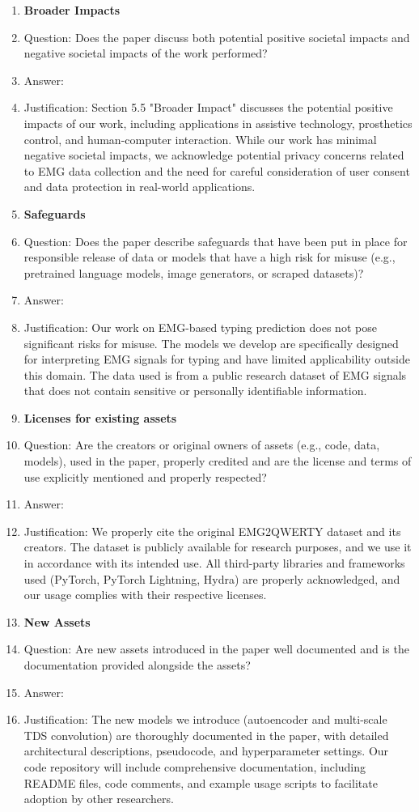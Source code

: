 \begin{enumerate}
\item {\bf Broader Impacts}
    \item[] Question: Does the paper discuss both potential positive societal impacts and negative societal impacts of the work performed?
    \item[] Answer: \answerYes{}
    \item[] Justification: Section 5.5 "Broader Impact" discusses the potential positive impacts of our work, including applications in assistive technology, prosthetics control, and human-computer interaction. While our work has minimal negative societal impacts, we acknowledge potential privacy concerns related to EMG data collection and the need for careful consideration of user consent and data protection in real-world applications.

\item {\bf Safeguards}
    \item[] Question: Does the paper describe safeguards that have been put in place for responsible release of data or models that have a high risk for misuse (e.g., pretrained language models, image generators, or scraped datasets)?
    \item[] Answer: \answerNA{}
    \item[] Justification: Our work on EMG-based typing prediction does not pose significant risks for misuse. The models we develop are specifically designed for interpreting EMG signals for typing and have limited applicability outside this domain. The data used is from a public research dataset of EMG signals that does not contain sensitive or personally identifiable information.

\item {\bf Licenses for existing assets}
    \item[] Question: Are the creators or original owners of assets (e.g., code, data, models), used in the paper, properly credited and are the license and terms of use explicitly mentioned and properly respected?
    \item[] Answer: \answerYes{}
    \item[] Justification: We properly cite the original EMG2QWERTY dataset and its creators. The dataset is publicly available for research purposes, and we use it in accordance with its intended use. All third-party libraries and frameworks used (PyTorch, PyTorch Lightning, Hydra) are properly acknowledged, and our usage complies with their respective licenses.

\item {\bf New Assets}
    \item[] Question: Are new assets introduced in the paper well documented and is the documentation provided alongside the assets?
    \item[] Answer: \answerYes{}
    \item[] Justification: The new models we introduce (autoencoder and multi-scale TDS convolution) are thoroughly documented in the paper, with detailed architectural descriptions, pseudocode, and hyperparameter settings. Our code repository will include comprehensive documentation, including README files, code comments, and example usage scripts to facilitate adoption by other researchers.


\end{enumerate}
